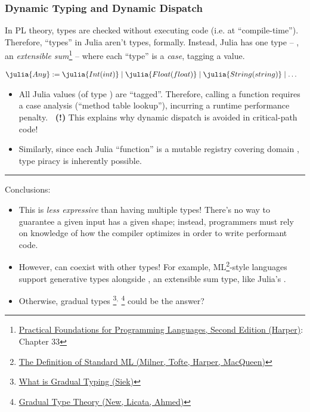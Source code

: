 \documentclass[8pt]{beamer}
\newcommand{\yikes}{\textbf{\color{red}\ (!) }}
\begin{document}
\begin{frame}
  \frametitle{Dynamic Typing and Dynamic Dispatch}

  In PL theory, types are checked without executing code (i.e. at ``compile-time''). Therefore, ``types'' in Julia aren't types, formally. Instead, Julia has one type -- , an \emph{extensible sum}\footnote{\href{http://www.cs.cmu.edu/~rwh/pfpl/}{Practical Foundations for Programming Languages, Second Edition (Harper)}: Chapter 33} -- where each ``type'' is a \emph{case}, tagging a value.

  \begin{align*}
    &\julia{Any} := \julia{Int(int)} \mid \julia{Float(float)} \mid \julia{String(string)} \mid \dots
  \end{align*}

  \begin{itemize}
    \item All Julia values (of type ) are ``tagged''. Therefore, calling a function requires a case analysis (``method table lookup''), incurring a runtime performance penalty. \yikes This explains why dynamic dispatch is avoided in critical-path code!
    \item Similarly, since each Julia ``function'' is a mutable registry covering domain , type piracy is inherently possible.
  \end{itemize}

  \noindent\rule{\linewidth}{0.4pt}

  Conclusions:
  \begin{itemize}
    \item This is \emph{less expressive} than having multiple types! There's no way to guarantee a given input has a given shape; instead, programmers must rely on knowledge of how the compiler optimizes in order to write performant code.
    \item However,  can coexist with other types! For example, ML\footnote{\href{https://smlfamily.github.io/sml97-defn.pdf}{The Definition of Standard ML (Milner, Tofte, Harper, MacQueen)}}-style languages support generative types alongside , an extensible sum type, like Julia's .
    \item Otherwise, gradual types%
    \footnote{\href{https://wphomes.soic.indiana.edu/jsiek/what-is-gradual-typing/}{What is Gradual Typing (Siek)}}$^,$%
    \footnote{\href{http://www.ccs.neu.edu/home/amal/papers/gtt.pdf}{Gradual Type Theory (New, Licata, Ahmed)}}
    could be the answer?
  \end{itemize}
\end{frame}
\end{document}
